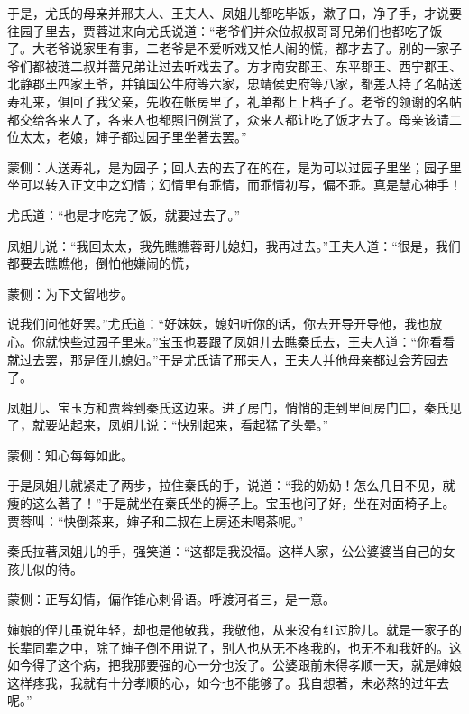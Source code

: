 \begin{parag}
    于是，尤氏的母亲并邢夫人、王夫人、凤姐儿都吃毕饭，漱了口，净了手，才说要往园子里去，贾蓉进来向尤氏说道：“老爷们并众位叔叔哥哥兄弟们也都吃了饭了。大老爷说家里有事，二老爷是不爱听戏又怕人闹的慌，都才去了。别的一家子爷们都被琏二叔并蔷兄弟让过去听戏去了。方才南安郡王、东平郡王、西宁郡王、北静郡王四家王爷，并镇国公牛府等六家，忠靖侯史府等八家，都差人持了名帖送寿礼来，俱回了我父亲，先收在帐房里了，礼单都上上档子了。老爷的领谢的名帖都交给各来人了，各来人也都照旧例赏了，众来人都让吃了饭才去了。母亲该请二位太太，老娘，婶子都过园子里坐著去罢。”\begin{note}蒙侧：人送寿礼，是为园子；回人去的去了在的在，是为可以过园子里坐；园子里坐可以转入正文中之幻情；幻情里有乖情，而乖情初写，偏不乖。真是慧心神手！\end{note}尤氏道：“也是才吃完了饭，就要过去了。”
\end{parag}


\begin{parag}
    凤姐儿说：“我回太太，我先瞧瞧蓉哥儿媳妇，我再过去。”王夫人道：“很是，我们都要去瞧瞧他，倒怕他嫌闹的慌，\begin{note}蒙侧：为下文留地步。\end{note}说我们问他好罢。”尤氏道：“好妹妹，媳妇听你的话，你去开导开导他，我也放心。你就快些过园子里来。”宝玉也要跟了凤姐儿去瞧秦氏去，王夫人道：“你看看就过去罢，那是侄儿媳妇。”于是尤氏请了邢夫人，王夫人并他母亲都过会芳园去了。
\end{parag}


\begin{parag}
    凤姐儿、宝玉方和贾蓉到秦氏这边来。进了房门，悄悄的走到里间房门口，秦氏见了，就要站起来，凤姐儿说：“快别起来，看起猛了头晕。”\begin{note}蒙侧：知心每每如此。\end{note}于是凤姐儿就紧走了两步，拉住秦氏的手，说道：“我的奶奶！怎么几日不见，就瘦的这么著了！”于是就坐在秦氏坐的褥子上。宝玉也问了好，坐在对面椅子上。贾蓉叫：“快倒茶来，婶子和二叔在上房还未喝茶呢。”
\end{parag}


\begin{parag}
    秦氏拉著凤姐儿的手，强笑道：“这都是我没福。这样人家，公公婆婆当自己的女孩儿似的待。\begin{note}蒙侧：正写幻情，偏作锥心刺骨语。呼渡河者三，是一意。\end{note}婶娘的侄儿虽说年轻，却也是他敬我，我敬他，从来没有红过脸儿。就是一家子的长辈同辈之中，除了婶子倒不用说了，别人也从无不疼我的，也无不和我好的。这如今得了这个病，把我那要强的心一分也没了。公婆跟前未得孝顺一天，就是婶娘这样疼我，我就有十分孝顺的心，如今也不能够了。我自想著，未必熬的过年去呢。”
\end{parag}


